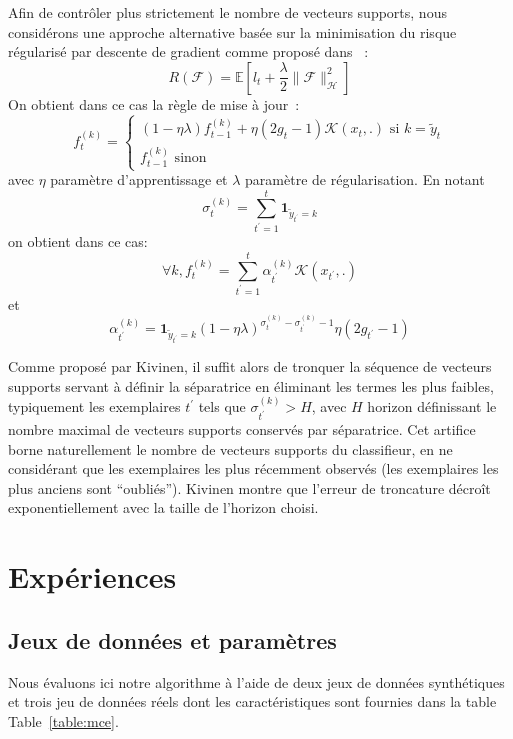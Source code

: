 \documentclass[twocolumn]{article}
\begin{document}
Afin de contrôler plus strictement le nombre de vecteurs supports, nous considérons une approche alternative basée sur la minimisation du risque régularisé par descente de gradient comme proposé dans \cite{kivinen2004online}~:
$$R(\mathcal{F}) = \mathbb{E}\left[ l_t + \frac{\lambda}{2}\|\mathcal{F}\|^2_\mathcal{H}\right]$$
On obtient dans ce cas la règle de mise à jour~:
$$f_t^{(k)}=\left\{
\begin{array}{l}
(1-\eta\lambda) f_{t-1}^{(k)} + \eta (2g_t-1) \mathcal{K}(x_t,.) \text{ si } k=\tilde{y}_t\\
 f_{t-1}^{(k)} \text{ sinon}
\end{array}
\right.
$$
avec $\eta$ paramètre d'apprentissage et $\lambda$ paramètre de régularisation. En notant 
$$\sigma_t^{(k)} = \sum_{t^\prime=1}^t
\mathbf{1}_{\tilde{y}_{t^\prime}=k}$$
on obtient dans ce cas:
$$\forall k, f^{(k)}_t = \sum_{t^\prime = 1} ^t \alpha_{t^\prime}^{(k)} \mathcal{K}(x_{t^\prime},.)$$
et
$$\alpha_{t^\prime}^{(k)} = \mathbf{1}_{\tilde{y}_{t^\prime}=k}(1 - \eta \lambda)^{\sigma_t^{(k)} - \sigma_{t^\prime}^{(k)}-1}  \eta (2g_{t^\prime}-1)$$

Comme proposé par Kivinen, il suffit alors de tronquer la séquence de vecteurs supports servant à définir la séparatrice en éliminant les termes les plus faibles, typiquement les exemplaires $t^\prime$ tels que $\sigma_{t^\prime}^{(k)} > H$, avec $H$ horizon définissant le nombre maximal de vecteurs supports conservés par séparatrice. Cet artifice borne naturellement le nombre de vecteurs supports du classifieur, en ne considérant que les exemplaires les plus récemment observés (les exemplaires les plus anciens sont ``oubliés'').  Kivinen montre que l'erreur de troncature décroît exponentiellement avec la taille de l'horizon choisi. 


  


\section{Expériences}

\subsection{Jeux de données et paramètres}
\label{subsec:BPAE}
Nous évaluons ici notre algorithme à l'aide de deux jeux de données synthétiques et trois jeu de données réels dont les caractéristiques sont fournies dans la table Table~\ref{table:mce}.
\end{document}
